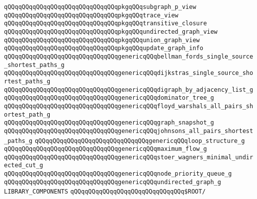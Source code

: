 \verb|qQQqqQQqqQQqqQQqqQQqqQQqqQQqqQQqpkgqQQqsubgraph_p_view|\newline
\verb|qQQqqQQqqQQqqQQqqQQqqQQqqQQqqQQqpkgqQQqtrace_view|\newline
\verb|qQQqqQQqqQQqqQQqqQQqqQQqqQQqqQQqpkgqQQqtransitive_closure|\newline
\verb|qQQqqQQqqQQqqQQqqQQqqQQqqQQqqQQqpkgqQQqundirected_graph_view|\newline
\verb|qQQqqQQqqQQqqQQqqQQqqQQqqQQqqQQqpkgqQQqunion_graph_view|\newline
\verb|qQQqqQQqqQQqqQQqqQQqqQQqqQQqqQQqpkgqQQqupdate_graph_info|\newline
\newline
\verb|qQQqqQQqqQQqqQQqqQQqqQQqqQQqqQQqgenericqQQqbellman_fords_single_source_shortest_paths_g|\newline
\verb|qQQqqQQqqQQqqQQqqQQqqQQqqQQqqQQqgenericqQQqdijkstras_single_source_shortest_paths_g|\newline
\verb|qQQqqQQqqQQqqQQqqQQqqQQqqQQqqQQqgenericqQQqdigraph_by_adjacency_list_g|\newline
\verb|qQQqqQQqqQQqqQQqqQQqqQQqqQQqqQQqgenericqQQqdominator_tree_g|\newline
\verb|qQQqqQQqqQQqqQQqqQQqqQQqqQQqqQQqgenericqQQqfloyd_warshals_all_pairs_shortest_path_g|\newline
\verb|qQQqqQQqqQQqqQQqqQQqqQQqqQQqqQQqgenericqQQqgraph_snapshot_g|\newline
\verb|qQQqqQQqqQQqqQQqqQQqqQQqqQQqqQQqgenericqQQqjohnsons_all_pairs_shortest_paths_g|\newline
\verb|qQQqqQQqqQQqqQQqqQQqqQQqqQQqqQQqgenericqQQqloop_structure_g|\newline
\verb|qQQqqQQqqQQqqQQqqQQqqQQqqQQqqQQqgenericqQQqmaximum_flow_g|\newline
\verb|qQQqqQQqqQQqqQQqqQQqqQQqqQQqqQQqgenericqQQqstoer_wagners_minimal_undirected_cut_g|\newline
\verb|qQQqqQQqqQQqqQQqqQQqqQQqqQQqqQQqgenericqQQqnode_priority_queue_g|\newline
\verb|qQQqqQQqqQQqqQQqqQQqqQQqqQQqqQQqgenericqQQqundirected_graph_g|\newline
\newline
\newline
\newline
\verb|LIBRARY_COMPONENTS|\newline
\newline
\verb|qQQqqQQqqQQqqQQqqQQqqQQqqQQqqQQq$ROOT/|\newline
